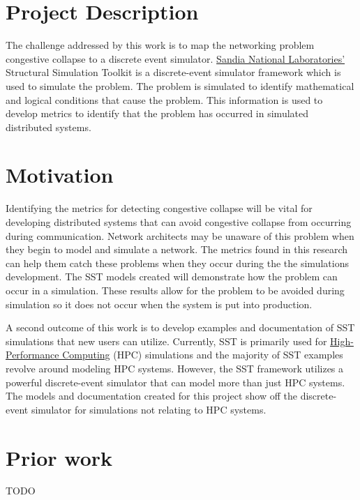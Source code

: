 \documentclass{article}
\begin{document}
\section{Project Description} %

The challenge addressed by this work is to map the networking problem congestive collapse to a discrete event simulator. \href{https://www.sandia.gov/}{Sandia National Laboratories'} Structural Simulation Toolkit is a discrete-event simulator framework which is used to simulate the problem. The problem is simulated to identify mathematical and logical conditions that cause the problem. This information is used to develop metrics to identify that the problem has occurred in simulated distributed systems.

\section{Motivation} %

Identifying the metrics for detecting congestive collapse will be vital for developing distributed systems that can avoid congestive collapse from occurring during communication. Network architects may be unaware of this problem when they begin to model and simulate a network. The metrics found in this research can help them catch these problems when they occur during the the simulations development. The SST models created will demonstrate how the problem can occur in a simulation. These results allow for the problem to be avoided during simulation so it does not occur when the system is put into production.

A second outcome of this work is to develop examples and documentation of SST simulations that new users can utilize. Currently, SST is primarily used for \href{https://en.wikipedia.org/wiki/High-performance_computing}{High-Performance Computing} (HPC) simulations and the majority of SST examples revolve around modeling HPC systems. However, the SST framework utilizes a powerful discrete-event simulator that can model more than just HPC systems. The models and documentation created for this project show off the discrete-event simulator for simulations not relating to HPC systems.

\section{Prior work} %
TODO
\end{document}
